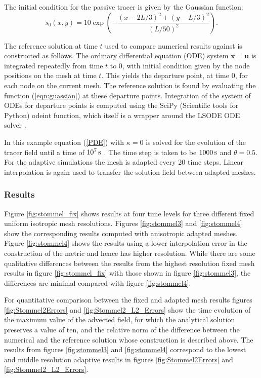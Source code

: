The initial condition for the passive tracer is given by the Gaussian function:
\begin{equation}
s_0(x,y) = 10\exp\left({-\frac{(x-2L/3)^2 + (y-L/3)^2}{(L/50)^2}}\right).
\label{eqn:guassian}
\end{equation}

The reference solution at time $t$ used to compare numerical results against
is constructed as follows.  The ordinary differential equation (ODE) system
$\dot{\pmb{x}}=\pmb{u}$ is integrated repeatedly from time $t$ to $0$, with
initial condition given by the node positions on the mesh at time $t$.  This
yields the departure point, at time $0$, for each node on the current mesh.
The reference solution is found by evaluating the function
(\ref{eqn:guassian}) at these departure points.  Integration of the system
of ODEs for departure points is computed using the SciPy (Scientific tools
for Python) odeint function, which itself is a wrapper around the LSODE ODE
solver \cite{hindmarsh1983}.

In this example equation (\ref{PDE}) with $\kappa = 0$ is solved for the evolution of the tracer field until a
time of $\s[10^7]$ . The time step is taken to be $\s[1000]$ and $\theta=0.5$.
For the adaptive simulations the mesh is adapted every 20 time steps.
Linear interpolation is again used to transfer the solution field between adapted meshes.

\subsubsection{Results}

Figure \ref{fig:stommel_fix} shows results at four time levels for three
different fixed uniform isotropic mesh resolutions. Figures \ref{fig:stommel3}
and \ref{fig:stommel4} show the corresponding results computed with anisotropic
adapted meshes. Figure \ref{fig:stommel4} shows the results using a lower interpolation
error in the construction of the metric and hence has higher resolution. While there
are some qualitative differences between the results from the highest resolution fixed
mesh results in figure \ref{fig:stommel_fix} with those shown in figure \ref{fig:stommel3},
the differences are minimal compared with figure \ref{fig:stommel4}.

For quantitative comparison between the fixed and adapted mesh results figures \ref{fig:Stommel2Errors}
and \ref{fig:Stommel2_L2_Errors} show the time evolution of the maximum value of the advected field,
for which the analytical solution preserves a value of ten,
and the relative \Ltwo norm \cite{hanert2004} of the difference between the numerical and the reference
solution whose construction is described above. The results from figures \ref{fig:stommel3} and \ref{fig:stommel4}
correspond to the lowest and middle resolution adaptive results in figures \ref{fig:Stommel2Errors} and
\ref{fig:Stommel2_L2_Errors}.


